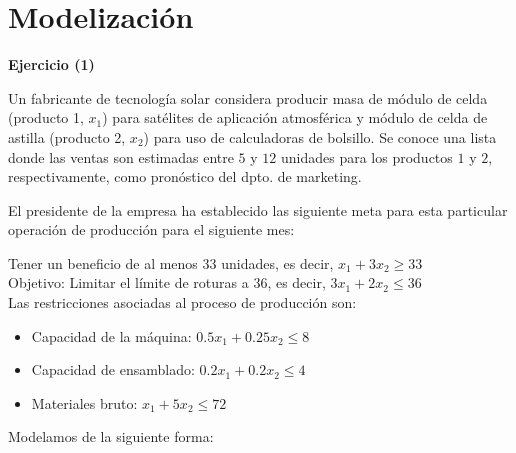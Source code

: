 \documentclass[a4paper,12pt]{article}
\newenvironment{exercise}[1]%
{%
  \par\vspace{\baselineskip}\noindent
  \textbf{Ejercicio (#1)}\begin{itshape}%
  \par\vspace{\baselineskip}\noindent\ignorespaces
}%
{%
  \end{itshape}\ignorespacesafterend
}
\begin{document}
\pagebreak
\tableofcontents
\pagebreak

\section{Modelizaci\'on}

\begin{exercise}{1}
Un fabricante de tecnolog\'ia solar considera producir masa de m\'odulo de celda (producto 1, $x_1$) para sat\'elites de aplicaci\'on atmosf\'erica  y m\'odulo de celda de astilla (producto 2, $x_2$) para uso de calculadoras de bolsillo. Se conoce una lista donde las ventas son estimadas entre $5$ y $12$ unidades para los productos $1$ y $2$, respectivamente, como pron\'ostico del dpto. de marketing.

El presidente de la empresa ha establecido las siguiente meta para esta particular operaci\'on de producci\'on para el siguiente mes:

Tener un beneficio de al menos 33 unidades, es decir, $x_1 + 3x_2 \geq 33$\\
Objetivo: Limitar el l\'imite de roturas a 36, es decir, $3x_1 + 2x_2 \leq 36$\\
Las restricciones asociadas al proceso de producci\'on son:\\

\begin{itemize}

\item Capacidad de la m\'aquina: $0.5x_1 + 0.25x_2 \leq 8$

\item Capacidad de ensamblado: $0.2x_1 + 0.2x_2 \leq 4$

\item Materiales bruto: $x_1 + 5x_2 \leq 72$

\end{itemize}
\end{exercise}


Modelamos de la siguiente forma:
\end{document}
